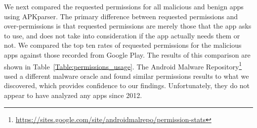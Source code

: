 \documentclass{llncs}
\begin{document}





We next compared the requested permissions for all malicious and benign apps using APKparser. The primary difference between requested permissions and over-permissions is that requested permissions are merely those that the app asks to use, and does not take into consideration if the app actually needs them or not. We compared the top ten rates of requested permissions for the malicious apps against those recorded from Google Play. The results of this comparison are shown in Table~\ref{Table:permissions_usage}. The Android Malware Repository\footnote{\url{https://sites.google.com/site/androidmalrepo/permission-stats}} used a different malware oracle and found similar permissions results to what we discovered, which provides confidence to our findings. Unfortunately, they do not appear to have analyzed any apps since 2012.





\end{document}
